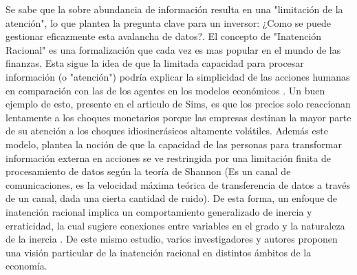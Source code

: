 Se sabe que la sobre abundancia de información resulta en una "limitación de la atención", lo que plantea la pregunta clave para un inversor: ¿Como se puede gestionar eficazmente esta avalancha de datos?.
El concepto de "Inatención Racional" es una formalización que cada vez es mas popular en el mundo de las finanzas. Esta sigue la idea de que la limitada capacidad para procesar información (o "atención") podría explicar la simplicidad de las acciones humanas en comparación con las de los agentes en los modelos  económicos \cite{sims_implications_2003}. Un buen ejemplo de esto, presente en el articulo de Sims, es que los precios solo reaccionan lentamente a los choques monetarios porque las empresas destinan la mayor parte de su atención a los choques idiosincrásicos altamente volátiles. Además este modelo, plantea la noción de que la capacidad de las personas para transformar información externa en acciones se ve restringida por una limitación finita de procesamiento de datos según la teoría de Shannon (Es un canal de comunicaciones, es la velocidad máxima teórica de transferencia de datos a través de un canal, dada una cierta cantidad de ruido). De esta forma, un enfoque de inatención racional implica un comportamiento generalizado de inercia y erraticidad, la cual sugiere conexiones entre variables en el grado y la naturaleza de la inercia . De este mismo estudio, varios investigadores y autores proponen una visión particular de la inatención racional en distintos ámbitos de la economía.

\vspace{0.5cm}

